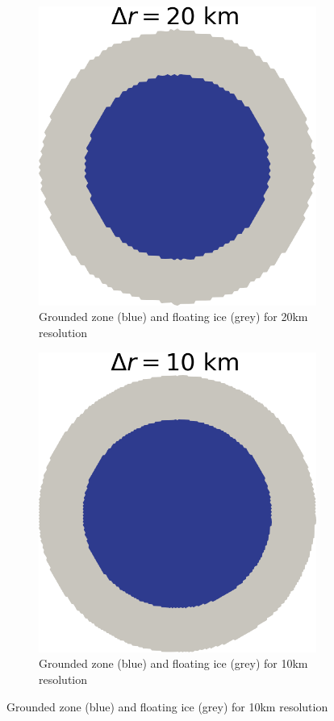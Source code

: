 \documentclass{article}
\begin{document}
\begin{figure}[!h]
\begin{subfigure}{0.25\textwidth}
		\includegraphics[width=\linewidth]{../fig/Grounded_zone_20km_CONE.png}
		\caption{Grounded zone (blue) and floating ice (grey) for 20km resolution}
		\label{figCONE20}
	\end{subfigure}\hfil %
	\begin{subfigure}{0.25\textwidth}
		\includegraphics[width=\linewidth]{../fig/Grounded_zone_10km_CONE.png}
		\caption{Grounded zone (blue) and floating ice (grey) for 10km resolution}
		\label{figCONE10KM}
	\end{subfigure}
	

\end{figure}
\end{document}
